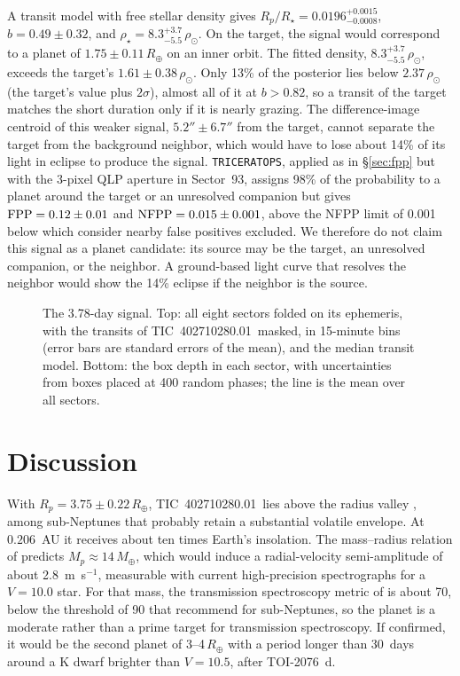 \documentclass[twocolumn,linenumbers]{aastex701}
\newcommand{\planet}{TIC~402710280.01}
\newcommand{\rearth}{R_\oplus}
\begin{document}
A transit model with free stellar density gives $R_p/R_\star = 0.0196^{+0.0015}_{-0.0008}$, $b = 0.49 \pm 0.32$, and $\rho_\star = 8.3^{+3.7}_{-5.5}\,\rho_\odot$. On the target, the signal would correspond to a planet of $1.75 \pm 0.11\,\rearth$ on an inner orbit. The fitted density, $8.3^{+3.7}_{-5.5}\,\rho_\odot$, exceeds the target's $1.61 \pm 0.38\,\rho_\odot$. Only 13\% of the posterior lies below $2.37\,\rho_\odot$ (the target's value plus $2\sigma$), almost all of it at $b > 0.82$, so a transit of the target matches the short duration only if it is nearly grazing. The difference-image centroid of this weaker signal, $5.2'' \pm 6.7''$ from the target, cannot separate the target from the background neighbor, which would have to lose about 14\% of its light in eclipse to produce the signal. \texttt{TRICERATOPS}, applied as in \S\ref{sec:fpp} but with the 3-pixel QLP aperture in Sector~93, assigns 98\% of the probability to a planet around the target or an unresolved companion but gives ${\rm FPP} = 0.12 \pm 0.01$ and ${\rm NFPP} = 0.015 \pm 0.001$, above the NFPP limit of 0.001 below which \citet{Giacalone2021} consider nearby false positives excluded. We therefore do not claim this signal as a planet candidate: its source may be the target, an unresolved companion, or the neighbor. A ground-based light curve that resolves the neighbor would show the 14\% eclipse if the neighbor is the source.

\begin{figure}
\caption{The 3.78-day signal. Top: all eight sectors folded on its ephemeris, with the transits of \planet\ masked, in 15-minute bins (error bars are standard errors of the mean), and the median transit model. Bottom: the box depth in each sector, with uncertainties from boxes placed at 400 random phases; the line is the mean over all sectors.\label{fig:second}}
\end{figure}

\section{Discussion} \label{sec:discussion}

With $R_p = 3.75 \pm 0.22\,\rearth$, \planet\ lies above the radius valley \citep{Fulton2017}, among sub-Neptunes that probably retain a substantial volatile envelope. At $0.206$~AU it receives about ten times Earth's insolation. The mass--radius relation of \citet{ChenKipping2017} predicts $M_p \approx 14\,M_\oplus$, which would induce a radial-velocity semi-amplitude of about 2.8~m~s$^{-1}$, measurable with current high-precision spectrographs for a $V = 10.0$ star. For that mass, the transmission spectroscopy metric of \citet{Kempton2018} is about 70, below the threshold of 90 that \citet{Kempton2018} recommend for sub-Neptunes, so the planet is a moderate rather than a prime target for transmission spectroscopy. If confirmed, it would be the second planet of 3--4\,$\rearth$ with a period longer than 30~days around a K dwarf brighter than $V = 10.5$, after TOI-2076~d.
\end{document}
